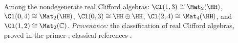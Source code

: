 Among the nondegenerate real Clifford algebras: $\Cl(1,3) \cong \Mat_2(\HH)$, $\Cl(0,4) \cong \Mat_2(\HH)$, $\Cl(0,3) \cong \HH \oplus \HH$, $\Cl(2,4) \cong \Mat_4(\HH)$, and $\Cl(1,2) \cong \Mat_2(\mathbb{C})$. \emph{Provenance:} the classification of real Clifford algebras, proved in the primer \cite[Thm.~9.3]{ButlerT0}; classical references \cite{Porteous1995, Lounesto2001}.
